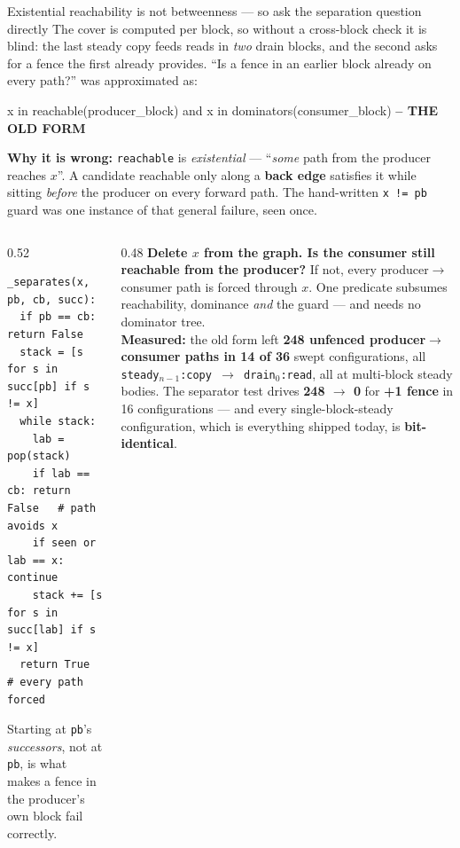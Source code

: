 \documentclass[aspectratio=169,9pt]{beamer}
\newcommand{\tsub}[1]{{\footnotesize\color{gray}#1}}
\newcommand{\key}[1]{\textcolor{acc}{\textbf{#1}}}
\newcommand{\bad}[1]{\textcolor{warn}{\textbf{#1}}}
\newcommand{\good}[1]{\textcolor{ok}{\textbf{#1}}}
\begin{document}
\begin{frame}[fragile]{Existential reachability is not betweenness --- so ask the separation question directly}
\footnotesize
The cover is computed per block, so without a cross-block check it is blind: the last steady copy feeds reads in
\emph{two} drain blocks, and the second asks for a fence the first already provides.
``Is a fence in an earlier block already on every path?'' was approximated as:

\begin{center}\ttfamily\scriptsize
x in reachable(producer\_block) \quad and \quad x in dominators(consumer\_block) \quad\quad \bad{-- THE OLD FORM}
\end{center}

\bad{Why it is wrong:} \texttt{reachable} is \emph{existential} --- ``\emph{some} path from the producer reaches
$x$''. A candidate reachable only along a \key{back edge} satisfies it while sitting \emph{before} the producer on
every forward path. The hand-written \texttt{x != pb} guard was one instance of that general failure, seen once.

\begin{columns}[T]
\begin{column}{0.52\textwidth}
\begin{lstlisting}[style=pseudo]
_separates(x, pb, cb, succ):
  if pb == cb: return False
  stack = [s for s in succ[pb] if s != x]
  while stack:
    lab = pop(stack)
    if lab == cb: return False   # path avoids x
    if seen or lab == x: continue
    stack += [s for s in succ[lab] if s != x]
  return True                    # every path forced
\end{lstlisting}
\tsub{Starting at \texttt{pb}'s \emph{successors}, not at \texttt{pb}, is what makes a fence in the producer's own
block fail correctly.}
\end{column}
\begin{column}{0.48\textwidth}
\good{Delete $x$ from the graph. Is the consumer still reachable from the producer?} If not, every
producer$\to$consumer path is forced through $x$. One predicate subsumes reachability, dominance \emph{and} the
guard --- and needs no dominator tree.\\[4pt]
\textbf{Measured:} the old form left \bad{248 unfenced producer$\to$consumer paths in 14 of 36} swept
configurations, all \texttt{steady$_{n-1}$:copy $\to$ drain$_0$:read}, all at multi-block steady bodies.
The separator test drives \good{248 $\to$ 0} for \textbf{+1 fence} in 16 configurations --- and every
single-block-steady configuration, which is everything shipped today, is \good{bit-identical}.
\end{column}
\end{columns}
\end{frame}
\end{document}
